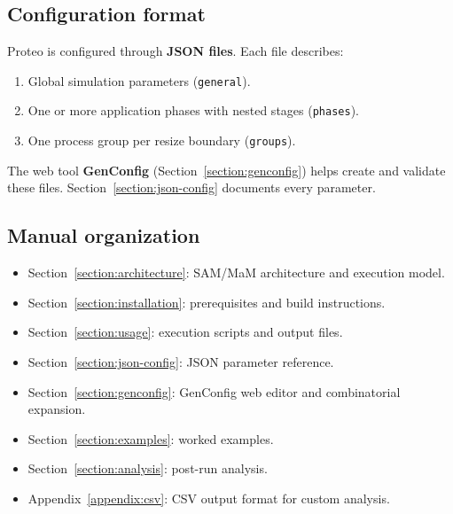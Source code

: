 \subsection{Configuration format}

Proteo is configured through \textbf{JSON files}. Each file describes:

\begin{enumerate}
  \item Global simulation parameters (\texttt{general}).
  \item One or more application phases with nested stages (\texttt{phases}).
  \item One process group per resize boundary (\texttt{groups}).
\end{enumerate}

The web tool \textbf{GenConfig} (Section~\ref{section:genconfig}) helps create and validate these files. Section~\ref{section:json-config} documents every parameter.

\subsection{Manual organization}

\begin{itemize}
  \item Section~\ref{section:architecture}: SAM/MaM architecture and execution model.
  \item Section~\ref{section:installation}: prerequisites and build instructions.
  \item Section~\ref{section:usage}: execution scripts and output files.
  \item Section~\ref{section:json-config}: JSON parameter reference.
  \item Section~\ref{section:genconfig}: GenConfig web editor and combinatorial expansion.
  \item Section~\ref{section:examples}: worked examples.
  \item Section~\ref{section:analysis}: post-run analysis.
  \item Appendix~\ref{appendix:csv}: CSV output format for custom analysis.
\end{itemize}
